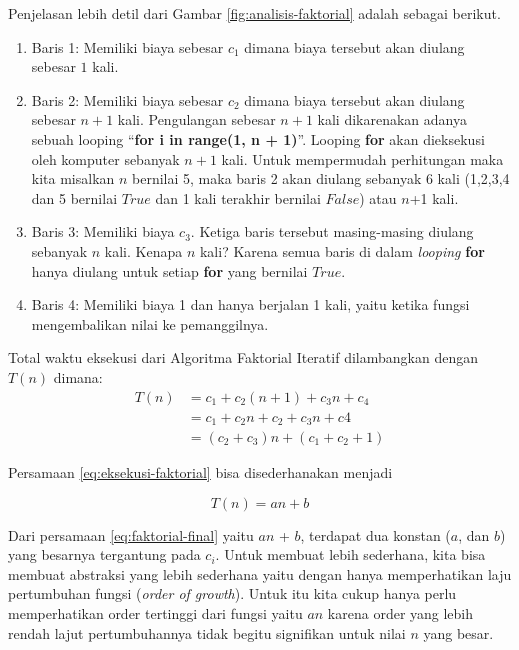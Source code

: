 Penjelasan lebih detil dari Gambar \ref{fig:analisis-faktorial} adalah sebagai berikut.

\begin{enumerate}
	\item Baris 1: Memiliki biaya sebesar $c_1$ dimana biaya tersebut akan diulang sebesar $1$ kali.  
	\item Baris 2: Memiliki biaya sebesar $c_2$ dimana biaya tersebut akan diulang sebesar $n+1$ kali. Pengulangan sebesar $n+1$ kali dikarenakan adanya sebuah looping ``\textbf{for i in range(1, n + 1)}''. Looping \textbf{for} akan dieksekusi oleh komputer sebanyak $n+1$ kali. Untuk mempermudah perhitungan maka kita misalkan $n$ bernilai 5, maka baris 2 akan diulang sebanyak 6 kali (1,2,3,4 dan 5 bernilai $True$ dan 1 kali terakhir bernilai $False$) atau $n$+1 kali.
	\item Baris 3: Memiliki biaya $c_{3}$. Ketiga baris tersebut masing-masing diulang sebanyak $n$ kali. Kenapa $n$ kali? Karena semua baris di dalam \textit{looping} \textbf{for} hanya diulang untuk setiap \textbf{for} yang bernilai $True$.
	\item Baris 4: Memiliki biaya 1 dan hanya berjalan 1 kali, yaitu ketika fungsi mengembalikan nilai ke pemanggilnya.
\end{enumerate}

Total waktu eksekusi dari Algoritma Faktorial Iteratif dilambangkan dengan $T(n)$ dimana:
\begin{equation}\label{eq:eksekusi-faktorial}
    \begin{aligned}
        T(n) &= c_{1} + c_{2}(n+1) + c_{3}n + c_{4}    \\ 
             &= c_{1} + c_{2}n + c_{2} + c_{3}n + c{4} \\
             &= (c_{2}+c_{3})n + (c_{1}+c_{2}+1)
    \end{aligned} 
\end{equation}

Persamaan \ref{eq:eksekusi-faktorial} bisa disederhanakan menjadi 

\begin{equation}\label{eq:faktorial-final}
    T(n) = an + b 
\end{equation}


Dari persamaan \ref{eq:faktorial-final} yaitu $an$ + $b$, terdapat dua konstan ($a$, dan $b$) yang besarnya tergantung pada $c_i$. Untuk membuat lebih sederhana, kita bisa membuat abstraksi yang lebih sederhana yaitu dengan hanya memperhatikan laju pertumbuhan fungsi (\textit{order of growth}). Untuk itu kita cukup hanya perlu memperhatikan order tertinggi dari fungsi yaitu $an$ karena order yang lebih rendah lajut pertumbuhannya tidak begitu signifikan untuk nilai $n$ yang besar.

